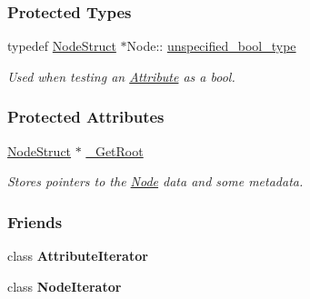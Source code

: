 \subsubsection*{Protected Types}
\begin{DoxyCompactItemize}
\item 
\hypertarget{classMezzanine_1_1xml_1_1Node_ae06889c194a23137077708c0879c92d0}{
typedef \hyperlink{classNodeStruct}{NodeStruct} $\ast$Node:: \hyperlink{classMezzanine_1_1xml_1_1Node_ae06889c194a23137077708c0879c92d0}{unspecified\_\-bool\_\-type}}
\label{classMezzanine_1_1xml_1_1Node_ae06889c194a23137077708c0879c92d0}

\begin{DoxyCompactList}\small\item\em Used when testing an \hyperlink{classMezzanine_1_1xml_1_1Attribute}{Attribute} as a bool. \item\end{DoxyCompactList}\end{DoxyCompactItemize}
\subsubsection*{Protected Attributes}
\begin{DoxyCompactItemize}
\item 
\hypertarget{classMezzanine_1_1xml_1_1Node_ac2eb9a41489c682a24434526f2c178f6}{
\hyperlink{classNodeStruct}{NodeStruct} $\ast$ \hyperlink{classMezzanine_1_1xml_1_1Node_ac2eb9a41489c682a24434526f2c178f6}{\_\-GetRoot}}
\label{classMezzanine_1_1xml_1_1Node_ac2eb9a41489c682a24434526f2c178f6}

\begin{DoxyCompactList}\small\item\em Stores pointers to the \hyperlink{classMezzanine_1_1xml_1_1Node}{Node} data and some metadata. \item\end{DoxyCompactList}\end{DoxyCompactItemize}
\subsubsection*{Friends}
\begin{DoxyCompactItemize}
\item 
\hypertarget{classMezzanine_1_1xml_1_1Node_a1ed8790083a80b2604beba1c666bce6e}{
class {\bfseries AttributeIterator}}
\label{classMezzanine_1_1xml_1_1Node_a1ed8790083a80b2604beba1c666bce6e}

\item 
\hypertarget{classMezzanine_1_1xml_1_1Node_ac5a1d2c6036b7ba1894a7c3b8d96a312}{
class {\bfseries NodeIterator}}
\label{classMezzanine_1_1xml_1_1Node_ac5a1d2c6036b7ba1894a7c3b8d96a312}

\end{DoxyCompactItemize}


